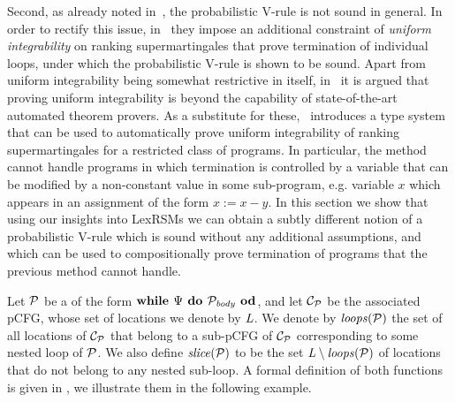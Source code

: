 Second, as already noted in~\cite{HolgerPOPL}, the probabilistic V-rule is not 
sound in general. In order to rectify this issue, in~\cite{HolgerPOPL} they 
impose an additional constraint of \emph{uniform integrability} on ranking 
supermartingales that prove termination of individual loops, 
under which the probabilistic V-rule is shown to be sound. Apart from uniform 
integrability being somewhat restrictive in itself, in~\cite{HolgerPOPL} it is 
argued that proving uniform integrability is beyond the capability of 
state-of-the-art automated theorem provers. As a substitute for 
these,~\cite{HolgerPOPL} introduces a type system that can be used to 
automatically prove 
uniform integrability of ranking supermartingales for a restricted class of 
programs. In particular, the method cannot handle programs in which termination 
is controlled by a variable that can be modified by a non-constant value in some sub-program, e.g. 
variable $x$ which appears in an assignment of the form $x:=x-y$. In this 
section we show that using our insights into LexRSMs we 
can obtain a subtly different notion of a probabilistic V-rule which is sound 
without any additional assumptions, and which can be used to compositionally prove termination 
of programs that the previous method cannot handle. 

Let $\mathcal{P}$ be a \PP{} of the form $\textbf{while } \Psi \textbf{ do } 
\mathcal{P}_{\mathit{body}} \textbf{ od}$, and let $\mathcal{C}_{\mathcal{P}}$ be the associated pCFG, whose set of locations we denote by $\mathit{L}$. We denote by $\mathit{loops}(\mathcal{P})$ the set of all locations of $\mathcal{C}_{\mathcal{P}}$ that belong to a sub-pCFG of $\mathcal{C}_{\mathcal{P}}$ corresponding to some nested loop of $\mathcal{P}$. We also define $\mathit{slice}(\mathcal{P})$ to be the set $\mathit{L}\setminus\mathit{loops}(\mathcal{P})$ of locations that do not belong to any nested sub-loop.  A formal definition of 
both functions is given in \AppendixMaterial, we illustrate them in the 
following example.

